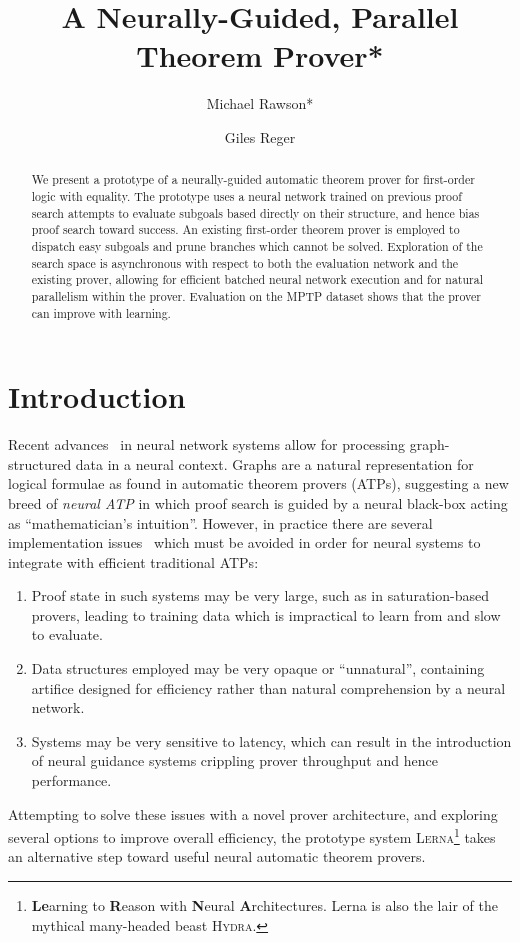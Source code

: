 \documentclass{llncs}
\newcommand{\lerna}{\textsc{Lerna}}
\begin{document}
\title{A Neurally-Guided, Parallel Theorem Prover*}
\author{
	Michael Rawson* \and
	Giles Reger
}
\maketitle

\begin{abstract}
	We present a prototype of a neurally-guided automatic theorem prover for first-order logic with equality.
	The prototype uses a neural network trained on previous proof search attempts to evaluate subgoals based directly on their structure, and hence bias proof search toward success.
	An existing first-order theorem prover is employed to dispatch easy subgoals and prune branches which cannot be solved.
	Exploration of the search space is asynchronous with respect to both the evaluation network and the existing prover, allowing for efficient batched neural network execution and for natural parallelism within the prover.
	Evaluation on the MPTP dataset shows that the prover can improve with learning.
\end{abstract}

\section{Introduction}
Recent advances~ in neural network systems allow for processing graph-structured data in a neural context.
Graphs are a natural representation for logical formulae as found in automatic theorem provers (ATPs), suggesting a new breed of \emph{neural ATP} in which proof search is guided by a neural black-box acting as ``mathematician's intuition''.
However, in practice there are several implementation issues~\cite{lerna-discussion} which must be avoided in order for neural systems to integrate with efficient traditional ATPs:
\begin{enumerate}
	\item Proof state in such systems may be very large, such as in saturation-based provers, leading to training data which is impractical to learn from and slow to evaluate.
	\item Data structures employed may be very opaque or ``unnatural'', containing artifice designed for efficiency rather than natural comprehension by a neural network.
	\item Systems may be very sensitive to latency, which can result in the introduction of neural guidance systems crippling prover throughput and hence performance.
\end{enumerate}
%
Attempting to solve these issues with a novel prover architecture, and exploring several options to improve overall efficiency, the prototype system \lerna{}\footnote{\textbf{Le}arning to \textbf{R}eason with \textbf{N}eural \textbf{A}rchitectures. Lerna is also the lair of the mythical many-headed beast \textsc{Hydra}.} takes an alternative step toward useful neural automatic theorem provers.
\end{document}
